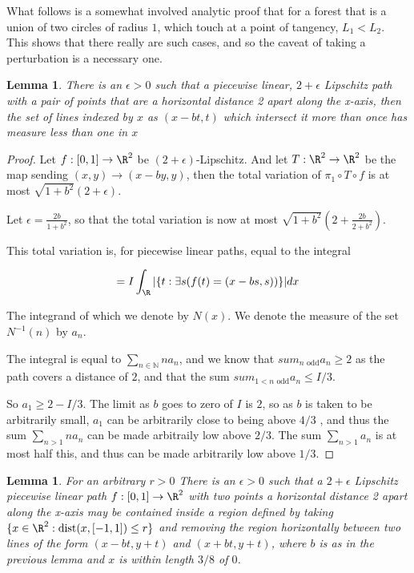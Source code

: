 \documentclass{journal}
\newtheorem{lem}[thm]{Lemma}          %
\theoremstyle{definition}
\newcommand{\N}{\mathbb{N}}
\begin{document}
What follows is a somewhat involved analytic proof that for a forest that is a union of two circles of radius $1$, which touch at a point of tangency, $L_1 < L_2$. This shows that there really are such cases, and so the caveat of taking a perturbation is a necessary one.

\begin{lem}
There is an $\epsilon > 0$ such that a piecewise linear, $2+\epsilon$ Lipschitz path with a pair of points that are a horizontal distance 2 apart along the x-axis, then the set of lines indexed by $x$ as $(x-bt,t)$ which intersect it more than once has measure less than one in $x$
\end{lem}
\label{lem:linebound}

\begin{proof}
    Let $f:[0,1]\rightarrow \R^2$ be $(2+\epsilon)$-Lipschitz. And let $T:\R^2\rightarrow \R^2$ be the map sending $(x,y)\rightarrow (x-by,y)$, then the total variation of $\pi_1\circ T\circ f$ is at most $\sqrt{1+b^2}(2+\epsilon)$.

Let $\epsilon = \frac{2b}{1+b^2}$, so that the total variation is now at most $\sqrt{1+b^2}(2+\frac{2b}{2+b^2})$.

This total variation is, for piecewise linear paths, equal to the integral

$$= I \int_\R |\{t:\exists s (f(t) = (x-bs,s)) \}|dx$$

The integrand of which we denote by $N(x)$. We denote the measure of the set $N^{-1}(n)$ by $a_n$.

The integral is equal to $\sum_{n\in\N}na_n$, and we know that $sum_{n \text{ odd}}a_n \geq 2$ as the path covers a distance of $2$, and that the sum $sum_{1 < n \text{ odd}}a_n \leq I/3$.

So $a_1 \geq 2 - I/3$. The limit as $b$ goes to zero of $I$ is $2$, so as $b$ is taken to be arbitrarily small, $a_1$ can be arbitrarily close to being above $4/3$ , and thus the sum $\sum_{n > 1}na_n$ can be made arbitraily low above $2/3$. The sum $\sum_{n > 1}a_n$ is at most half this, and thus can be made arbitrarily low above $1/3$.
\end{proof}

\begin{lem}
    For an arbitrary $r> 0$ There is an $\epsilon > 0$ such that a $2+\epsilon$ Lipschitz piecewise linear path $f:[0,1]\rightarrow \R^2$ with two points a horizontal distance 2 apart along the x-axis may be contained inside a region defined by taking $\{x\in\R^2: \mathrm{dist}(x,[-1,1]) \leq r\}$ and removing the region horizontally between two lines of the form $(x-bt,y+t)$ and $(x+bt,y+t)$, where $b$ is as in the previous lemma and $x$ is within length $3/8$ of $0$.
\end{lem}
\label{lem:outbound}
\end{document}
